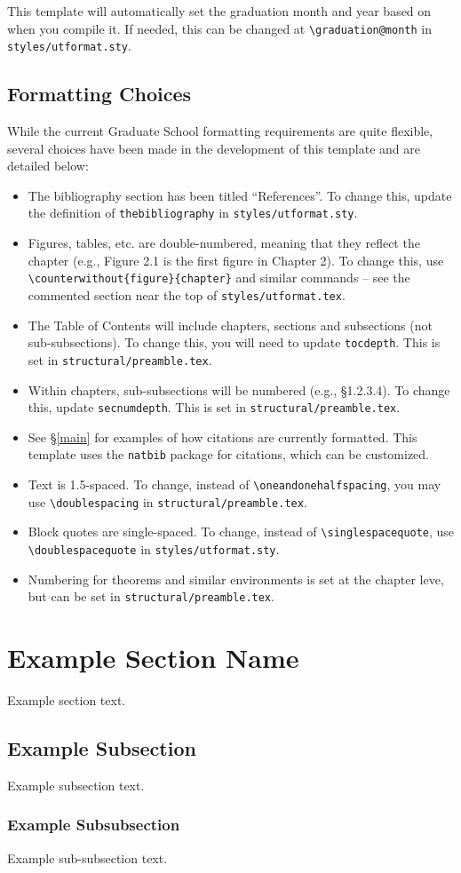 This template will automatically set the graduation month and year based on when you compile it. If needed, this can be changed at \texttt{\textbackslash{}graduation@month} in \\\texttt{styles/utformat.sty}.

\subsection{Formatting Choices}
While the current Graduate School formatting requirements are quite flexible, several choices have been made in the development of this template and are detailed below:
\begin{itemize}
    \item The bibliography section has been titled ``References''. To change this, update the definition of \texttt{thebibliography} in \texttt{styles/utformat.sty}.
    \item Figures, tables, etc. are double-numbered, meaning that they reflect the chapter (e.g., Figure 2.1 is the first figure in Chapter 2). To change this, use \\\texttt{\textbackslash{}counterwithout\{figure\}\{chapter\}} and similar commands -- see the commented section near the top of \texttt{styles/utformat.tex}.
    \item The Table of Contents will include chapters, sections and subsections (not sub-subsections). To change this, you will need to update \texttt{tocdepth}. This is set in \texttt{structural/preamble.tex}.
    \item Within chapters, sub-subsections will be numbered (e.g., \S1.2.3.4). To change this, update \texttt{secnumdepth}. This is set in \texttt{structural/preamble.tex}.
    \item See \S\ref{main} for examples of how citations are currently formatted. This template uses the \texttt{natbib} package for citations, which can be customized.
    \item Text is 1.5-spaced. To change, instead of \texttt{\textbackslash{}oneandonehalfspacing}, you may use \texttt{\textbackslash{}doublespacing} in \texttt{structural/preamble.tex}.
    \item Block quotes are single-spaced. To change, instead of \texttt{\textbackslash{}singlespacequote}, use \texttt{\textbackslash{}doublespacequote} in \texttt{styles/utformat.sty}.
    \item Numbering for theorems and similar environments is set at the chapter leve, but can be set in \texttt{structural/preamble.tex}.
\end{itemize}


\section{Example Section Name}
Example section text.

\subsection{Example Subsection}
Example subsection text.

\subsubsection{Example Subsubsection}
Example sub-subsection text.
